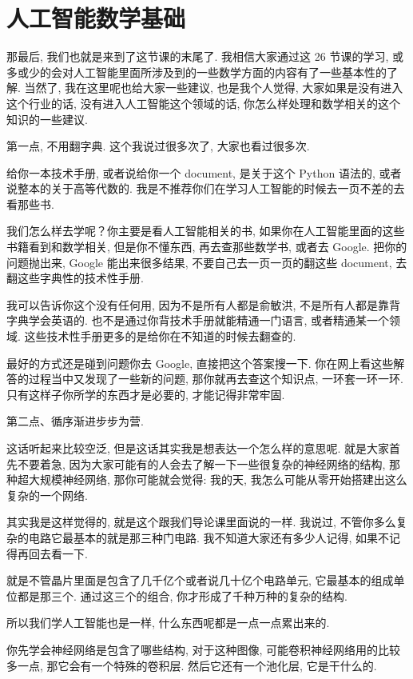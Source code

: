 \section{人工智能数学基础}

那最后, 我们也就是来到了这节课的末尾了. 我相信大家通过这 26 节课的学习, 或多或少的会对人工智能里面所涉及到的一些数学方面的内容有了一些基本性的了解. 当然了, 我在这里呢也给大家一些建议, 也是我个人觉得, 大家如果是没有进入这个行业的话, 没有进入人工智能这个领域的话, 你怎么样处理和数学相关的这个知识的一些建议. 

第一点, 不用翻字典. 这个我说过很多次了, 大家也看过很多次. 

给你一本技术手册, 或者说给你一个 document, 是关于这个 Python 语法的, 或者说整本的关于高等代数的. 我是不推荐你们在学习人工智能的时候去一页不差的去看那些书. 

我们怎么样去学呢？你主要是看人工智能相关的书, 如果你在人工智能里面的这些书籍看到和数学相关, 但是你不懂东西, 再去查那些数学书, 或者去 Google. 把你的问题抛出来, Google 能出来很多结果, 不要自己去一页一页的翻这些 document, 去翻这些字典性的技术性手册. 

我可以告诉你这个没有任何用, 因为不是所有人都是俞敏洪, 不是所有人都是靠背字典学会英语的. 也不是通过你背技术手册就能精通一门语言, 或者精通某一个领域. 这些技术性手册更多的是给你在不知道的时候去翻查的. 

最好的方式还是碰到问题你去 Google, 直接把这个答案搜一下. 你在网上看这些解答的过程当中又发现了一些新的问题, 那你就再去查这个知识点, 一环套一环一环. 只有这样子你所学的东西才是必要的, 才能记得非常牢固. 

第二点、循序渐进步步为营. 

这话听起来比较空泛, 但是这话其实我是想表达一个怎么样的意思呢. 就是大家首先不要着急, 因为大家可能有的人会去了解一下一些很复杂的神经网络的结构, 那种超大规模神经网络, 那你可能就会觉得: 我的天, 我怎么可能从零开始搭建出这么复杂的一个网络. 

其实我是这样觉得的, 就是这个跟我们导论课里面说的一样. 我说过, 不管你多么复杂的电路它最基本的就是那三种门电路. 我不知道大家还有多少人记得, 如果不记得再回去看一下. 

就是不管晶片里面是包含了几千亿个或者说几十亿个电路单元, 它最基本的组成单位都是那三个. 通过这三个的组合, 你才形成了千种万种的复杂的结构. 

所以我们学人工智能也是一样, 什么东西呢都是一点一点累出来的. 

你先学会神经网络是包含了哪些结构, 对于这种图像, 可能卷积神经网络用的比较多一点, 那它会有一个特殊的卷积层. 然后它还有一个池化层, 它是干什么的. 

